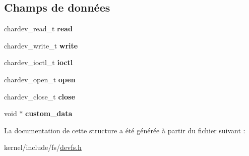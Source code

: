 \subsection*{\-Champs de données}
\begin{DoxyCompactItemize}
\item 
\hypertarget{structchardev__interfaces_afeba560360e6a5dfff549d78c220b68b}{chardev\-\_\-read\-\_\-t {\bfseries read}}\label{structchardev__interfaces_afeba560360e6a5dfff549d78c220b68b}

\item 
\hypertarget{structchardev__interfaces_a6f70961f2f888de24d500d50bae85a3f}{chardev\-\_\-write\-\_\-t {\bfseries write}}\label{structchardev__interfaces_a6f70961f2f888de24d500d50bae85a3f}

\item 
\hypertarget{structchardev__interfaces_a9e5903e31e8e5ab21e9abc4b3a844e4a}{chardev\-\_\-ioctl\-\_\-t {\bfseries ioctl}}\label{structchardev__interfaces_a9e5903e31e8e5ab21e9abc4b3a844e4a}

\item 
\hypertarget{structchardev__interfaces_a7962a67531ea5263a2f837c36fb18dc0}{chardev\-\_\-open\-\_\-t {\bfseries open}}\label{structchardev__interfaces_a7962a67531ea5263a2f837c36fb18dc0}

\item 
\hypertarget{structchardev__interfaces_a9cba421c4dddc041e4b5029d011dbbd9}{chardev\-\_\-close\-\_\-t {\bfseries close}}\label{structchardev__interfaces_a9cba421c4dddc041e4b5029d011dbbd9}

\item 
\hypertarget{structchardev__interfaces_a9b6b938d76fe7e20c93da8a032a42ad7}{void $\ast$ {\bfseries custom\-\_\-data}}\label{structchardev__interfaces_a9b6b938d76fe7e20c93da8a032a42ad7}

\end{DoxyCompactItemize}


\-La documentation de cette structure a été générée à partir du fichier suivant \-:\begin{DoxyCompactItemize}
\item 
kernel/include/fs/\hyperlink{devfs_8h}{devfs.\-h}\end{DoxyCompactItemize}
